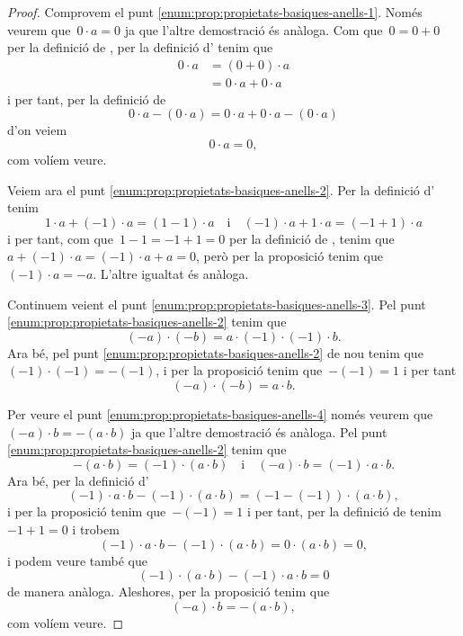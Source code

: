 \documentclass[../../main.tex]{subfiles}
\begin{document}
    \begin{proof}
        Comprovem el punt \eqref{enum:prop:propietats-basiques-anells-1}.
        Només veurem que~\(0\cdot a=0\) ja que l'altre demostració és anàloga.
        Com que~\(0=0+0\) per la definició de , per la definició d' tenim que
        \begin{align*}
        0\cdot a&=(0+0)\cdot a\\
        &=0\cdot a+0\cdot a
        \end{align*}
        i per tant, per la definició de 
        \[
            0\cdot a-(0\cdot a)=0\cdot a+0\cdot a-(0\cdot a)
        \]
        d'on veiem
        \[
            0\cdot a=0,
        \]
        com volíem veure.

        Veiem ara el punt \eqref{enum:prop:propietats-basiques-anells-2}.
        Per la definició d' tenim
        \[
            1\cdot a+(-1)\cdot a=(1-1)\cdot a\quad\text{i}\quad(-1)\cdot a+1\cdot a=(-1+1)\cdot a
        \]
        i per tant, com que~\(1-1=-1+1=0\) per la definició de , tenim que~\(a+(-1)\cdot a=(-1)\cdot a+a=0\), però per la proposició  tenim que~\((-1)\cdot a=-a\).
        L'altre igualtat és anàloga.

        Continuem veient el punt \eqref{enum:prop:propietats-basiques-anells-3}.
        Pel punt \eqref{enum:prop:propietats-basiques-anells-2} tenim que
        \[
            (-a)\cdot(-b)=a\cdot (-1)\cdot(-1)\cdot b.
        \]
        Ara bé, pel punt \eqref{enum:prop:propietats-basiques-anells-2} de nou tenim que~\((-1)\cdot(-1)=-(-1)\), i per la proposició  tenim que~\(-(-1)=1\) i per tant
        \[
            (-a)\cdot(-b)=a\cdot b.
        \]

        Per veure el punt \eqref{enum:prop:propietats-basiques-anells-4} només veurem que~\((-a)\cdot b=-(a\cdot b)\) ja que l'altre demostració és anàloga.
        Pel punt \eqref{enum:prop:propietats-basiques-anells-2} tenim que
        \[
            -(a\cdot b)=(-1)\cdot(a\cdot b)\quad{\text{i}}\quad(-a)\cdot b=(-1)\cdot a\cdot b.
        \]
        Ara bé, per la definició d'
        \[
            (-1)\cdot a\cdot b-(-1)\cdot(a\cdot b)=(-1-(-1))\cdot(a\cdot b),
        \]
        i per la proposició  tenim que~\(-(-1)=1\) i per tant, per la definició de  tenim~\(-1+1=0\) i trobem
        \[
            (-1)\cdot a\cdot b-(-1)\cdot(a\cdot b)=0\cdot(a\cdot b)=0,
        \]
        i podem veure també que
        \[
            (-1)\cdot(a\cdot b)-(-1)\cdot a\cdot b=0
        \]
        de manera anàloga.
        Aleshores, per la proposició  tenim que
        \[
            (-a)\cdot b=-(a\cdot b),
        \]
        com volíem veure.
    \end{proof}
\end{document}
